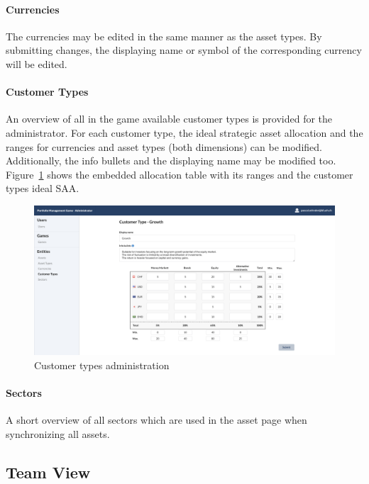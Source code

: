 \paragraph{Currencies}
The currencies may be edited in the same manner as the asset types. By submitting changes, the displaying name or symbol of the corresponding currency will be edited.

\paragraph{Customer Types}
An overview of all in the game available customer types is provided for the administrator. For each customer type, the ideal strategic asset allocation and the ranges for currencies and asset types (both dimensions) can be modified. Additionally, the info bullets and the displaying name may be modified too. Figure~\ref{fig:customer_types} shows the embedded allocation table with its ranges and the customer types ideal SAA.
\begin{figure}[h!]
  \centering
  \includegraphics[scale=0.2]{img/application-overview/administrator/entities_customer_types.png}
  \caption{Customer types administration}
  \label{fig:customer_types}
\end{figure}


\paragraph{Sectors}
A short overview of all sectors which are used in the asset page when synchronizing all assets.





\subsection{Team View}

